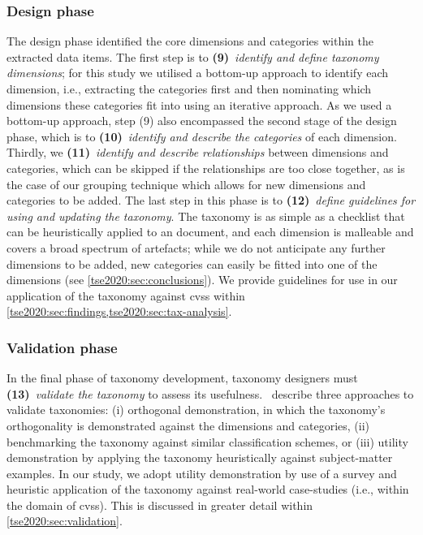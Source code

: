 \subsubsection{Design phase} The design phase identified the core dimensions and categories within the extracted data items. The first step is to \textbf{(9)}~\textit{identify and define taxonomy dimensions}; for this study we utilised a bottom-up approach to identify each dimension, i.e., extracting the categories first and then nominating which dimensions these categories fit into using an iterative approach. As we used a bottom-up approach, step (9) also encompassed the second stage of the design phase, which is to \textbf{(10)}~\textit{identify and describe the categories} of each dimension. Thirdly, we \textbf{(11)}~\textit{identify and describe relationships} between dimensions and categories, which can be skipped if the relationships are too close together, as is the case of our grouping technique which allows for new dimensions and categories to be added. The last step in this phase is to \textbf{(12)}~\textit{define guidelines for using and updating the taxonomy}. The taxonomy is as simple as a checklist that can be heuristically applied to an  document, and each dimension is malleable and covers a broad spectrum of artefacts; while we do not anticipate any further dimensions to be added, new categories can easily be fitted into one of the dimensions (see \cref{tse2020:sec:conclusions}). We provide guidelines for use in our application of the taxonomy against \glspl{cvs} within \cref{tse2020:sec:findings,tse2020:sec:tax-analysis}.

\subsubsection{Validation phase} In the final phase of taxonomy development, taxonomy designers must \textbf{(13)}~\textit{validate the taxonomy} to assess its usefulness.~\citet{Usman:2017hn} describe three approaches to validate taxonomies: (i) orthogonal demonstration, in which the taxonomy's orthogonality is demonstrated against the dimensions and categories, (ii) benchmarking the taxonomy against similar classification schemes, or (iii) utility demonstration by applying the taxonomy heuristically against subject-matter examples. In our study, we adopt utility demonstration by use of a survey and heuristic application of the taxonomy against real-world case-studies (i.e., within the domain of \glspl{cvs}). This is discussed in greater detail within \cref{tse2020:sec:validation}.


